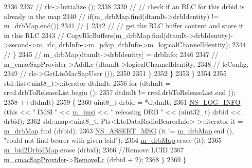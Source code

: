 \begin{DoxyCode}
2336 
2337             \textcolor{comment}{// rlc->Initialize ();    }
2338 
2339             \textcolor{comment}{// // check if an RLC for this drbid is already in the map}
2340             \textcolor{comment}{// if(m\_drbMap.find(dtamIt->drbIdentity) != m\_drbMap.end())}
2341             \textcolor{comment}{// \{}
2342             \textcolor{comment}{//   // get the RLC buffer content and store it in this RLC}
2343             \textcolor{comment}{//   CopyRlcBuffers(m\_drbMap.find(dtamIt->drbIdentity)->second->m\_rlc, drbInfo->m\_pdcp,
       drbInfo->m\_logicalChannelIdentity);}
2344             \textcolor{comment}{// \} }
2345             \textcolor{comment}{// m\_drbMap[dtamIt->drbIdentity] = drbInfo;}
2346 
2347             \textcolor{comment}{// m\_cmacSapProvider->AddLc (dtamIt->logicalChannelIdentity,}
2348             \textcolor{comment}{//                           lcConfig,}
2349             \textcolor{comment}{//                           rlc->GetLteMacSapUser ());}
2350 
2351           \}
2352         \}
2353     \}
2354   
2355   std::list<uint8\_t>::iterator dtdmIt;
2356   \textcolor{keywordflow}{for} (dtdmIt = rrcd.drbToReleaseList.begin ();
2357        dtdmIt != rrcd.drbToReleaseList.end ();
2358        ++dtdmIt)
2359     \{
2360       uint8\_t drbid = *dtdmIt;
2361       \hyperlink{group__logging_gafbd73ee2cf9f26b319f49086d8e860fb}{NS\_LOG\_INFO} (\textcolor{keyword}{this} << \textcolor{stringliteral}{" IMSI "} << \hyperlink{classns3_1_1LteUeRrc_a1d825677309d17bdf729920f7dafd011}{m\_imsi} << \textcolor{stringliteral}{" releasing DRB "} << (uint32\_t) drbid << 
      drbid);
2362       std::map<uint8\_t, Ptr<LteDataRadioBearerInfo> >::iterator it =   \hyperlink{classns3_1_1LteUeRrc_aa85c5bdde73c2072b2b3053e629bdce0}{m\_drbMap}.find (drbid);
2363       \hyperlink{assert_8h_aff5ece9066c74e681e74999856f08539}{NS\_ASSERT\_MSG} (it != \hyperlink{classns3_1_1LteUeRrc_aa85c5bdde73c2072b2b3053e629bdce0}{m\_drbMap}.end (), \textcolor{stringliteral}{"could not find bearer with given lcid"});
2364       \hyperlink{classns3_1_1LteUeRrc_aa85c5bdde73c2072b2b3053e629bdce0}{m\_drbMap}.erase (it);      
2365       \hyperlink{classns3_1_1LteUeRrc_a4b117cdc930ea78ed844b3fc44872d00}{m\_bid2DrbidMap}.erase (drbid);
2366       \textcolor{comment}{//Remove LCID}
2367       \hyperlink{classns3_1_1LteUeRrc_a5a7bffd2040d73eb5db1aaef849d0396}{m\_cmacSapProvider}->\hyperlink{classns3_1_1LteUeCmacSapProvider_a4d1b9e67debe6acb4558dcff8788349c}{RemoveLc} (drbid + 2);
2368     \}
2369 \}
\end{DoxyCode}


